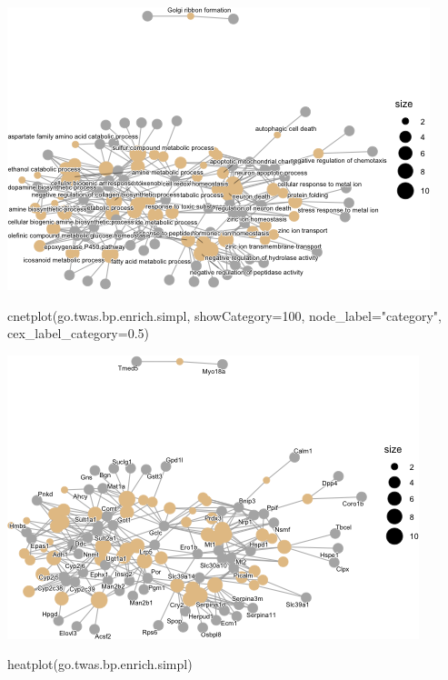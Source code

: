 \documentclass[
]{article}
\newenvironment{Shaded}{\begin{snugshade}}{\end{snugshade}}
\newcommand{\AttributeTok}[1]{\textcolor[rgb]{0.77,0.63,0.00}{#1}}
\newcommand{\DecValTok}[1]{\textcolor[rgb]{0.00,0.00,0.81}{#1}}
\newcommand{\FloatTok}[1]{\textcolor[rgb]{0.00,0.00,0.81}{#1}}
\newcommand{\FunctionTok}[1]{\textcolor[rgb]{0.00,0.00,0.00}{#1}}
\newcommand{\NormalTok}[1]{#1}
\newcommand{\StringTok}[1]{\textcolor[rgb]{0.31,0.60,0.02}{#1}}
\begin{document}
\includegraphics{figures/twas-go-hfd-3.png}

\begin{Shaded}
\begin{Highlighting}[]
\FunctionTok{cnetplot}\NormalTok{(go.twas.bp.enrich.simpl, }
         \AttributeTok{showCategory=}\DecValTok{100}\NormalTok{,}
         \AttributeTok{node\_label=}\StringTok{"category"}\NormalTok{,}
         \AttributeTok{cex\_label\_category=}\FloatTok{0.5}\NormalTok{)}
\end{Highlighting}
\end{Shaded}

\includegraphics{figures/twas-go-hfd-4.png}

\begin{Shaded}
\begin{Highlighting}[]
\FunctionTok{heatplot}\NormalTok{(go.twas.bp.enrich.simpl)}
\end{Highlighting}
\end{Shaded}
\end{document}
